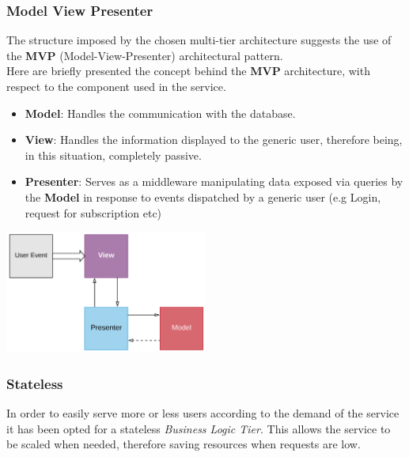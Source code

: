 \subsubsection{Model View Presenter}
The structure imposed by the chosen multi-tier architecture suggests the use of the \textbf{MVP} (Model-View-Presenter) architectural pattern.\\
Here are briefly presented the concept behind the \textbf{MVP} architecture, with respect to the component used in the service.
\begin{itemize}
    \item \textbf{Model}: Handles the communication with the database.
    \item \textbf{View}: Handles the information displayed to the generic user, therefore being, in this situation, completely passive.
    \item \textbf{Presenter}: Serves as a middleware manipulating data exposed via queries by the \textbf{Model} in response to events dispatched by a generic user (e.g Login, request for subscription etc)
\end{itemize}
\begin{center}
    \includegraphics[width=0.5\textwidth]{assets/MVP.pdf}
\end{center}

\subsubsection{Stateless}
In order to easily serve more or less users according to the demand of the service it has been opted for a stateless \textit{Business Logic Tier}. This allows the service to be scaled when needed, therefore saving resources when requests are low. 

